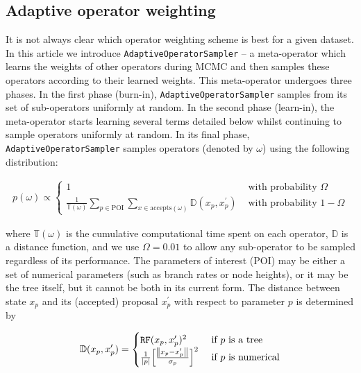 \documentclass[10pt,letterpaper]{article}
\begin{document}
\clearpage
\subsection*{Adaptive operator weighting}
\label{sect:adaptiveSampling}






It is not always clear which operator weighting scheme is best for a given dataset.
In this article we introduce \texttt{AdaptiveOperatorSampler} -- a meta-operator which learns the weights of other operators during MCMC and then samples these operators according to their learned weights.
This meta-operator undergoes three phases.
In the first phase (burn-in), \texttt{AdaptiveOperatorSampler} samples from its set of sub-operators uniformly at random.
In the second phase (learn-in), the meta-operator starts learning several terms detailed below whilst continuing to sample operators uniformly at random.
In its final phase, \texttt{AdaptiveOperatorSampler} samples operators (denoted by $\omega$) using the following distribution:


\begin{align}
\label{eqn:adaptiveSampler}
	p(\omega) \propto \begin{cases} 1 & \text{ with probability } \Omega \\ \frac{1}{\mathbb{T}(\omega)} \sum\limits_{p \in \text{POI}}  \sum\limits_{x \in \text{accepts}(\omega)}  \mathbb{D}(x_p, x_p^\prime) & \text{ with probability } 1-\Omega \end{cases}
\end{align}

\noindent
where $\mathbb{T}(\omega)$ is the cumulative computational time spent on each operator, $\mathbb{D}$ is a distance function, and we use $\Omega = 0.01$ to allow any sub-operator to be sampled regardless of its performance.
The parameters of interest (POI) may be either a set of numerical parameters (such as branch rates or node heights), or it may be the tree itself, but it cannot be both in its current form.
The distance between state $x_p$ and its (accepted) proposal $x_p^\prime$ with respect to parameter $p$ is determined by


\begin{align}
\label{eqn:distanceFunctions} 
	\mathbb{D}(x_p, x_p^\prime) = \begin{cases} \texttt{RF}(x_p, x_p^\prime)^2 & \text{ if } p \text{ is a tree} \\ 
	\frac{1}{|p|} \Big[ \frac{\norm{x_p - x_p^\prime}}{\sigma_p} \Big]^2    & \text{ if } p \text{ is numerical}  \end{cases}
\end{align}
\end{document}
